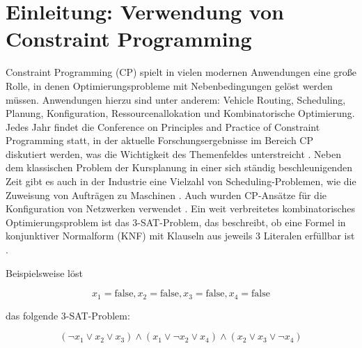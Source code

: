 




\tableofcontents

\clearpage
{}


\section{Einleitung: Verwendung von Constraint Programming}
\label{sec:Einleitung-Verwendung-von-Constraint-Programming}

Constraint Programming (CP) spielt in vielen modernen Anwendungen eine große
Rolle, in denen Optimierungsprobleme mit Nebenbedingungen gelöst werden müssen.
Anwendungen hierzu sind unter anderem: Vehicle Routing, Scheduling, Planung,
Konfiguration, Ressourcenallokation und Kombinatorische Optimierung. Jedes Jahr
findet die Conference on Principles and Practice of Constraint Programming
statt, in der aktuelle Forschungsergebnisse im Bereich CP diskutiert werden, was
die Wichtigkeit des Themenfeldes unterstreicht \cite{CP20we}. Neben dem
klassischen Problem der Kursplanung \cite{duboi96jo} in einer sich ständig
beschleunigenden Zeit gibt es auch in der Industrie eine Vielzahl von
Scheduling-Problemen, wie die Zuweisung von Aufträgen zu Maschinen
\cite{gedik16jo}. Auch wurden CP-Ansätze für die Konfiguration von Netzwerken
verwendet \cite{ardisjo}. Ein weit verbreitetes kombinatorisches
Optimierungsproblem ist das 3-SAT-Problem, das beschreibt, ob eine Formel in
konjunktiver Normalform (KNF) mit Klauseln aus jeweils 3 Literalen erfüllbar ist
\cite[271]{rossi06bo}. 

Beispielsweise löst

\[ x_1=\text{false}, x_2=\text{false}, x_3=\text{false}, x_4=\text{false} \]

das folgende 3-SAT-Problem:

\[ (\lnot x_1 \lor x_2 \lor x_3) \land (x_1 \lor \lnot x_2 \lor x_4) \land (x_2
\lor x_3 \lor \lnot x_4) \]

